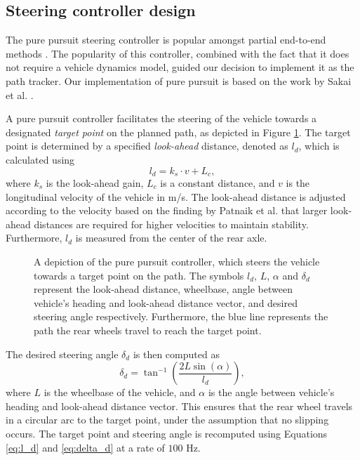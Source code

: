 \subsection{Steering controller design}

The pure pursuit steering controller is popular amongst partial end-to-end methods \cite{Evans2021b, Weiss2020}.
The popularity of this controller, combined with the fact that it does not require a vehicle dynamics model, guided our decision to implement it as the path tracker.
Our implementation of pure pursuit is based on the work by Sakai et al. \cite{Sakai2018}.


A pure pursuit controller facilitates the steering of the vehicle towards a designated \emph{target point} on the planned path, as depicted in Figure \ref{fig:pure_pursuit}. 
The target point is determined by a specified \emph{look-ahead} distance, denoted as $l_d$, which is calculated using
\begin{equation}\label{eq:l_d}
    l_d = k_s \cdot v + L_{c},
\end{equation}
where $k_s$ is the look-ahead gain, $L_{c}$ is a constant distance, and $v$ is the longitudinal velocity of the vehicle in m/s. 
The look-ahead distance is adjusted according to the velocity based on the finding by Patnaik et al. \cite{Patnaik2020} that larger look-ahead distances are required for higher velocities to maintain stability.
Furthermore, $l_d$ is measured from the center of the rear axle.

\begin{figure}[htb!]
    \centering
    
    \caption[A depiction of the pure pursuit controller]{A depiction of the pure pursuit controller, which steers the vehicle towards a target point on the path. The symbols $l_d$, $L$, $\alpha$ and $\delta_{d}$ represent the look-ahead distance, wheelbase, angle between vehicle's heading and look-ahead distance vector, and desired steering angle respectively. Furthermore, the blue line represents the path the rear wheels travel to reach the target point.}
    \label{fig:pure_pursuit}
\end{figure}

The desired steering angle $\delta_d$ is then computed as
\begin{equation}\label{eq:delta_d}
    \delta_d = \tan^{-1} \left( \frac{2L\sin(\alpha)}{l_d} \right),
\end{equation}
where $L$ is the wheelbase of the vehicle, and $\alpha$ is the angle between vehicle's heading and look-ahead distance vector.
This ensures that the rear wheel travels in a circular arc to the target point, under the assumption that no slipping occurs. 
The target point and steering angle is recomputed using Equations \ref{eq:l_d} and \ref{eq:delta_d} at a rate of $100$ Hz.










